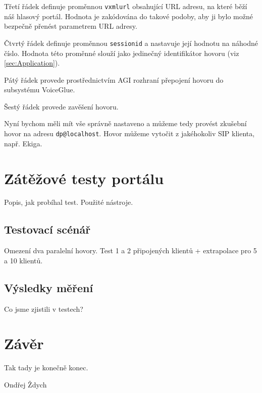 \documentclass[ing,male,java,dept460]{diploma}						%
\begin{document}
Třetí řádek definuje proměnnou \texttt{vxmlurl} obsahující URL adresu, na které běží náš hlasový portál. Hodnota je zakódována do takové podoby, aby ji bylo možné bezpečně přenést parametrem URL adresy.

Čtvrtý řádek definuje proměnnou \texttt{sessionid} a nastavuje její hodnotu na náhodné číslo. Hodnota této proměnné slouží jako jedinečný identifikátor hovoru (viz \ref{sec:Application}).

Pátý řádek provede prostřednictvím AGI rozhraní přepojení hovoru do subsystému VoiceGlue.

Šestý řádek provede zavěšení hovoru.

Nyní bychom měli mít vše správně nastaveno a můžeme tedy provést zkušební hovor na adresu \texttt{dp@localhost}. Hovor můžeme vytočit z jakéhokoliv SIP klienta, např. Ekiga.

\section{Zátěžové testy portálu}
\label{sec:Benchmark}
Popis, jak probíhal test. Použité nástroje.

\subsection{Testovací scénář}
Omezení dva paralelní hovory. Test 1 a 2 připojených klientů + extrapolace pro 5 a 10 klientů.

\subsection{Výsledky měření}
Co jsme zjistili v testech?


\section{Závěr}
\label{sec:Conclusion}
Tak tady je konečně konec.

\bigskip
\begin{flushright}
Ondřej Ždych
\end{flushright}
\end{document}
